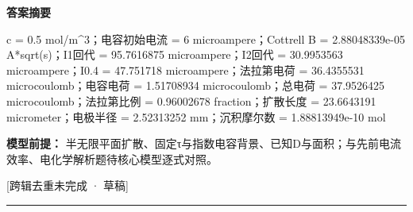 \documentclass[UTF8,11pt,a4paper]{ctexart}
\begin{document}
\noindent\textbf{答案摘要}\par
c = 0.5 mol/m\textasciicircum{}3；电容初始电流 = 6 microampere；Cottrell B = 2.88048339e-05 A*sqrt(s)；I1回代 = 95.7616875 microampere；I2回代 = 30.9953563 microampere；I0.4 = 47.751718 microampere；法拉第电荷 = 36.4355531 microcoulomb；电容电荷 = 1.51708934 microcoulomb；总电荷 = 37.9526425 microcoulomb；法拉第比例 = 0.96002678 fraction；扩散长度 = 23.6643191 micrometer；电极半径 = 2.52313252 mm；沉积摩尔数 = 1.88813949e-10 mol\par
\noindent\textbf{模型前提：}
半无限平面扩散、固定τ与指数电容背景、已知D与面积；与先前电流效率、电化学解析题待核心模型逐式对照。\par
\noindent\textcolor{red!65!black}{[跨辑去重未完成 · 草稿]} \par
\medskip\hrule\medskip
{}
\end{document}
